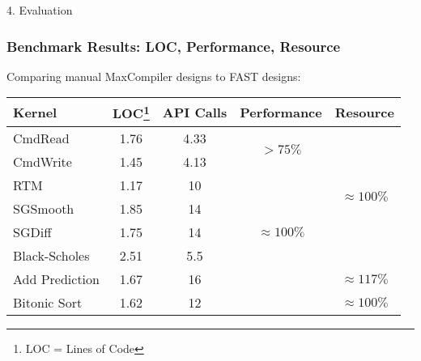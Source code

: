 \begin{comment}
  \begin{frame}{4. Evaluation: Reverse Time Migration}
    \begin{table}
    \end{table}
  \end{frame}
\end{comment}

\begin{frame}{4. Evaluation}
  \frametitle{Benchmark Results: LOC, Performance, Resource}
  Comparing manual MaxCompiler designs to FAST designs:
  {\footnotesize
    \begin{table}
      \renewcommand{\arraystretch}{1.5}
      \begin{tabular}{l|c|c|c|c}
        \textbf{Kernel} & \textbf{LOC\footnote{LOC = Lines of Code}} & \textbf{API Calls} & \textbf{Performance}              & \textbf{Resource}
        \\
        \hline\hline
        CmdRead         & 1.76               & 4.33                     & \multirow{2}{1.5cm}{$ > 75\%$}        & \multirow{6}{1.5cm}{$\approx 100\%$} \\
        CmdWrite        & 1.45               & 4.13                     &                                   &                              \\
        \cline{1-4}
        RTM             & 1.17               & 10                       & \multirow{5}{1.5cm}{$ \approx 100\%$} &                              \\
        SGSmooth        & 1.85               & 14                       &                                   &                              \\
        SGDiff         & 1.75               & 14                       &                                   &                              \\
        Black-Scholes   & 2.51               & 5.5                      &                                   &                              \\
        \cline{5-5}
        Add Prediction  & 1.67               & 16                       &                                   &    $ \approx 117 \% $                          \\
        Bitonic Sort & 1.62             & 12                    &                                   &    $ \approx 100 \% $                          \\
      \end{tabular}
    \end{table}}

\end{frame}